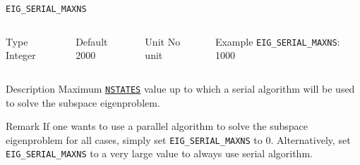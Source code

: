 \begin{frame}[allowframebreaks]{\texttt{EIG\_SERIAL\_MAXNS}} \label{EIG_SERIAL_MAXNS}
\vspace*{-12pt}
\begin{columns}
\begin{block}{Type}
Integer
\end{block}

\begin{block}{Default}
2000
\end{block}

\begin{block}{Unit}
No unit
\end{block}

\begin{block}{Example}
\texttt{EIG\_SERIAL\_MAXNS}: 1000
\end{block}
\end{columns}

\begin{block}{Description}
Maximum \hyperlink{NSTATES}{\texttt{NSTATES}} value up to which a serial algorithm will be used to solve the subspace eigenproblem.
\end{block}

\begin{block}{Remark}
If one wants to use a parallel algorithm to solve the subspace eigenproblem for all cases, simply set \texttt{EIG\_SERIAL\_MAXNS} to $0$. Alternatively, set \texttt{EIG\_SERIAL\_MAXNS} to a very large value to always use serial algorithm.
\end{block}
\end{frame}


